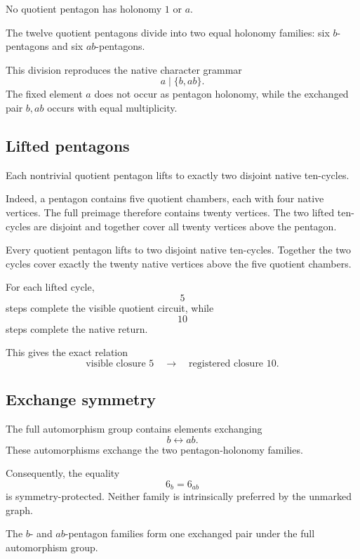 No quotient pentagon has holonomy \(1\) or \(a\).

\begin{theorem}
The twelve quotient pentagons divide into two equal holonomy families:
six \(b\)-pentagons and six \(ab\)-pentagons.
\end{theorem}

This division reproduces the native character grammar
\[
a\mid\{b,ab\}.
\]
The fixed element \(a\) does not occur as pentagon holonomy, while the
exchanged pair \(b,ab\) occurs with equal multiplicity.

\subsection{Lifted pentagons}

Each nontrivial quotient pentagon lifts to exactly two disjoint native
ten-cycles.

Indeed, a pentagon contains five quotient chambers, each with four
native vertices. The full preimage therefore contains twenty vertices.
The two lifted ten-cycles are disjoint and together cover all twenty
vertices above the pentagon.

\begin{theorem}
Every quotient pentagon lifts to two disjoint native ten-cycles.
Together the two cycles cover exactly the twenty native vertices above
the five quotient chambers.
\end{theorem}

For each lifted cycle,
\[
5
\]
steps complete the visible quotient circuit, while
\[
10
\]
steps complete the native return.

This gives the exact relation
\[
\boxed{\text{visible closure }5
\quad\longrightarrow\quad
\text{registered closure }10.}
\]

\subsection{Exchange symmetry}

The full automorphism group contains elements exchanging
\[
b\longleftrightarrow ab.
\]
These automorphisms exchange the two pentagon-holonomy families.

Consequently, the equality
\[
6_b=6_{ab}
\]
is symmetry-protected. Neither family is intrinsically preferred by
the unmarked graph.

\begin{proposition}
The \(b\)- and \(ab\)-pentagon families form one exchanged pair under
the full automorphism group.
\end{proposition}


